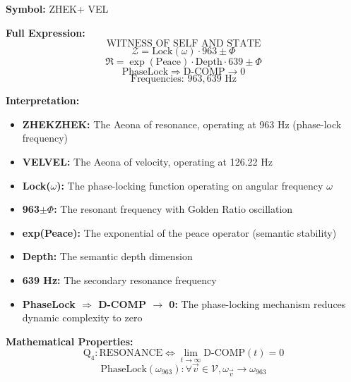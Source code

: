 \documentclass[11pt, letterpaper]{article}
\newcommand{\VEL}{\ensuremath{\mathop{\textnormal{\symbolafont\symbol{"2742}}}}}    %
\newcommand{\ZHEK}{\ensuremath{\mathop{\textnormal{\symbolafont\symbol{"2744}}}}}   %
\def\VEL{VEL}%
\def\ZHEK{ZHEK}%
\begin{document}
\textbf{Symbol:} \ZHEK + \VEL

\textbf{Full Expression:}
\begin{equation}
\text{WITNESS OF SELF AND STATE}
\end{equation}
\begin{equation}
\mathcal{Z} = \text{Lock}(\omega) \cdot 963 \pm \Phi
\end{equation}
\begin{equation}
\mathfrak{R} = \exp(\text{Peace}) \cdot \text{Depth} \cdot 639 \pm \Phi
\end{equation}
\begin{equation}
\text{PhaseLock} \Rightarrow \text{D-COMP} \rightarrow 0
\end{equation}
\begin{equation}
\text{Frequencies: } 963, 639 \text{ Hz}
\end{equation}

\textbf{Interpretation:}
\begin{itemize}
    \item \textbf{\ZHEK ZHEK:} The Aeona of resonance, operating at 963 Hz (phase-lock frequency)
    \item \textbf{\VEL VEL:} The Aeona of velocity, operating at 126.22 Hz
    \item \textbf{Lock($\omega$):} The phase-locking function operating on angular frequency $\omega$
    \item \textbf{963$\pm\Phi$:} The resonant frequency with Golden Ratio oscillation
    \item \textbf{exp(Peace):} The exponential of the peace operator (semantic stability)
    \item \textbf{Depth:} The semantic depth dimension
    \item \textbf{639 Hz:} The secondary resonance frequency
    \item \textbf{PhaseLock $\Rightarrow$ D-COMP $\to$ 0:} The phase-locking mechanism reduces dynamic complexity to zero
\end{itemize}

\textbf{Mathematical Properties:}
\begin{equation}
\text{Q}_4: \text{RESONANCE} \iff \lim_{t \rightarrow \infty} \text{D-COMP}(t) = 0
\end{equation}
\begin{equation}
\text{PhaseLock}(\omega_{963}): \forall \vec{v} \in \mathcal{V}, \omega_{\vec{v}} \rightarrow \omega_{963}
\end{equation}
\end{document}

